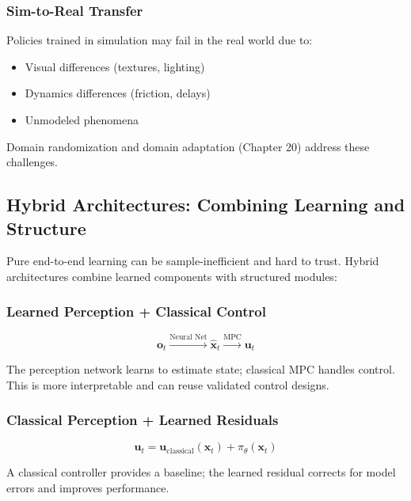 \subsubsection{Sim-to-Real Transfer}

Policies trained in simulation may fail in the real world due to:
\begin{itemize}
    \item Visual differences (textures, lighting)
    \item Dynamics differences (friction, delays)
    \item Unmodeled phenomena
\end{itemize}

Domain randomization and domain adaptation (Chapter 20) address these challenges.

\subsection{Hybrid Architectures: Combining Learning and Structure}

Pure end-to-end learning can be sample-inefficient and hard to trust. Hybrid architectures combine learned components with structured modules:

\subsubsection{Learned Perception + Classical Control}

\begin{equation}
\mathbf{o}_t \xrightarrow{\text{Neural Net}} \hat{\mathbf{x}}_t \xrightarrow{\text{MPC}} \mathbf{u}_t
\end{equation}

The perception network learns to estimate state; classical MPC handles control. This is more interpretable and can reuse validated control designs.

\subsubsection{Classical Perception + Learned Residuals}

\begin{equation}
\mathbf{u}_t = \mathbf{u}_{\text{classical}}(\mathbf{x}_t) + \pi_\theta(\mathbf{x}_t)
\end{equation}

A classical controller provides a baseline; the learned residual corrects for model errors and improves performance.

